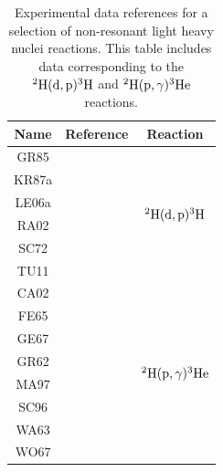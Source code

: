 \documentclass[openany]{book}
\begin{document}
\begin{table}[H]
	\centering
	\begin{tabular}{|c|c|c|}
		\hline
		Name & Reference & Reaction \\ \hline
		GR85 &  \cite{greife_gorris_junker_rolfs_zahnow_1995}  &   \multirow{6}{*}{$\ddexchange$}       \\ \cline{1-2}
		KR87a &  \cite{krauss_becker_trautvetter_rolfs_brand_1987}  &         \\ \cline{1-2}
		LE06a &     \cite{leonard_karwowski_brune_fisher_ludwig_2006}  &     \\ \cline{1-2}
		RA02 &    \cite{raiola_migliardi_gyurky_aliotta_formicola_bonetti_broggini_campajola_corvisiero_costantini_et_2002}      & \\ \cline{1-2}
		SC72 &    \cite{schulte_cosack_obst_weil_1972} & \\ \cline{1-2}
		TU11 &  \cite{tumino_spitaleri_mukhamedzhanov_typel_aliotta_burjan_delsanto_kiss_kroha_hons_et_2011} & \\ \hline
		CA02 &   \cite{casella_costantini_lemut_limata_bonetti_broggini_campajola_corvisiero_cruz_donofrio_et_2002}  &   \multirow{8}{*}{$\dRadiativeCapture$}         \\ \cline{1-2}
		FE65 &  \cite{fetisov_gorbunov_varfolomeev_1965} &         \\ \cline{1-2}
		GE67 &  \cite{geller_muirhead_cohen_1967} &     \\ \cline{1-2}
		GR62 &  \cite{griffiths_larson_robertson_1962} &     \\ \cline{1-2}
		MA97 &    \cite{ma_karwowski_brune_ayer_black_blackmon_ludwig_viviani_kievsky_schiavilla_et_1997} &  \\ \cline{1-2}
		SC96  &   \cite{schmid_viviani_rice_chasteler_godwin_kiang_kiang_kievsky_laymon_prior_et_1996} & \\ \cline{1-2}
		WA63 &   \cite{warren_erdman_robertson_axen_macdonald_1963} & \\ \cline{1-2}
		WO67  &   \cite{wolfli_bosch_lang_muller_marmier_1967} & \\ \hline
	\end{tabular}
	\caption[References $\ddexchange$ and $\dRadiativeCapture$ experimental data]{Experimental data references for a selection of non-resonant light heavy nuclei reactions. This table includes data corresponding to the $\ddexchange$ and $\dRadiativeCapture$ reactions.}
	\label{table:light_nonResonant}
\end{table}
\end{document}
